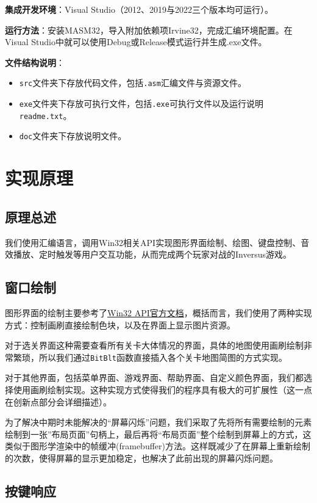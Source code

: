 \documentclass[lang=cn,11pt,a4paper]{elegantpaper}
\begin{document}
\noindent \textbf{集成开发环境}：Visual Studio（2012、2019与2022三个版本均可运行）。

\noindent \textbf{运行方法}：安装MASM32，导入附加依赖项Irvine32，完成汇编环境配置。在Visual Studio中就可以使用Debug或Release模式运行并生成.exe文件。

\noindent \textbf{文件结构说明}：
\begin{itemize}
    \item \verb|src|文件夹下存放代码文件，包括\verb|.asm|汇编文件与资源文件。
    \item \verb|exe|文件夹下存放可执行文件，包括\verb|.exe|可执行文件以及运行说明\verb|readme.txt|。
    \item \verb|doc|文件夹下存放说明文件。
\end{itemize}

\section{实现原理}
\subsection{原理总述}

我们使用汇编语言，调用Win32相关API实现图形界面绘制、绘图、键盘控制、音效播放、定时触发等用户交互功能，从而完成两个玩家对战的Inversus游戏。

\subsection{窗口绘制}

图形界面的绘制主要参考了\href{https://learn.microsoft.com/zh-cn/windows/win32/api/}{Win32 API官方文档}，概括而言，我们使用了两种实现方式：控制画刷直接绘制色块，以及在界面上显示图片资源。

对于选关界面这种需要查看所有关卡大体情况的界面，具体的地图使用画刷绘制非常繁琐，所以我们通过\verb|BitBlt|函数直接插入各个关卡地图简图的方式实现。

对于其他界面，包括菜单界面、游戏界面、帮助界面、自定义颜色界面，我们都选择使用画刷绘制实现。这种实现方式使得我们的程序具有极大的可扩展性（这一点在创新点部分会详细描述）。

为了解决中期时未能解决的“屏幕闪烁”问题，我们采取了先将所有需要绘制的元素绘制到一张”布局页面”句柄上，最后再将“布局页面”整个绘制到屏幕上的方式，这类似于图形学渲染中的帧缓冲(framebuffer)方法。这样既减少了在屏幕上重新绘制的次数，使得屏幕的显示更加稳定，也解决了此前出现的屏幕闪烁问题。

\subsection{按键响应}
\end{document}
